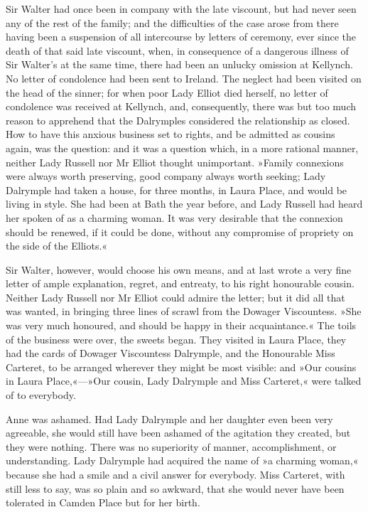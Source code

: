 Sir Walter had once been in company with the late viscount, but had never seen any of the rest of the family; and the difficulties of the case arose from there having been a suspension of all intercourse by letters of ceremony, ever since the death of that said late viscount, when, in consequence of a dangerous illness of Sir Walter's at the same time, there had been an unlucky omission at Kellynch. No letter of condolence had been sent to Ireland. The neglect had been visited on the head of the sinner; for when poor Lady Elliot died herself, no letter of condolence was received at Kellynch, and, consequently, there was but too much reason to apprehend that the Dalrymples considered the relationship as closed. How to have this anxious business set to rights, and be admitted as cousins again, was the question: and it was a question which, in a more rational manner, neither Lady Russell nor Mr Elliot thought unimportant. »Family connexions were always worth preserving, good company always worth seeking; Lady Dalrymple had taken a house, for three months, in Laura Place, and would be living in style. She had been at Bath the year before, and Lady Russell had heard her spoken of as a charming woman. It was very desirable that the connexion should be renewed, if it could be done, without any compromise of propriety on the side of the Elliots.«

Sir Walter, however, would choose his own means, and at last wrote a very fine letter of ample explanation, regret, and entreaty, to his right honourable cousin. Neither Lady Russell nor Mr Elliot could admire the letter; but it did all that was wanted, in bringing three lines of scrawl from the Dowager Viscountess. »She was very much honoured, and should be happy in their acquaintance.« The toils of the business were over, the sweets began. They visited in Laura Place, they had the cards of Dowager Viscountess Dalrymple, and the Honourable Miss Carteret, to be arranged wherever they might be most visible: and »Our cousins in Laura Place,«—»Our cousin, Lady Dalrymple and Miss Carteret,« were talked of to everybody.

Anne was ashamed. Had Lady Dalrymple and her daughter even been very agreeable, she would still have been ashamed of the agitation they created, but they were nothing. There was no superiority of manner, accomplishment, or understanding. Lady Dalrymple had acquired the name of »a charming woman,« because she had a smile and a civil answer for everybody. Miss Carteret, with still less to say, was so plain and so awkward, that she would never have been tolerated in Camden Place but for her birth.

